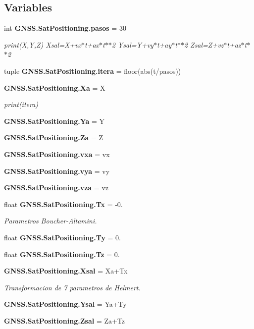 \subsection*{Variables}
\begin{DoxyCompactItemize}
\item 
int {\bf G\-N\-S\-S.\-Sat\-Positioning.\-pasos} = 30
\begin{DoxyCompactList}\small\item\em print(\-X,\-Y,\-Z) Xsal=X+vx$\ast$t+ax$\ast$t$\ast$$\ast$2 Ysal=Y+vy$\ast$t+ay$\ast$t$\ast$$\ast$2 Zsal=Z+vz$\ast$t+az$\ast$t$\ast$$\ast$2 \end{DoxyCompactList}\item 
tuple {\bf G\-N\-S\-S.\-Sat\-Positioning.\-itera} = floor(abs(t/pasos))
\item 
{\bf G\-N\-S\-S.\-Sat\-Positioning.\-Xa} = X
\begin{DoxyCompactList}\small\item\em print(itera) \end{DoxyCompactList}\item 
{\bf G\-N\-S\-S.\-Sat\-Positioning.\-Ya} = Y
\item 
{\bf G\-N\-S\-S.\-Sat\-Positioning.\-Za} = Z
\item 
{\bf G\-N\-S\-S.\-Sat\-Positioning.\-vxa} = vx
\item 
{\bf G\-N\-S\-S.\-Sat\-Positioning.\-vya} = vy
\item 
{\bf G\-N\-S\-S.\-Sat\-Positioning.\-vza} = vz
\item 
float {\bf G\-N\-S\-S.\-Sat\-Positioning.\-Tx} = -\/0.
\begin{DoxyCompactList}\small\item\em Parametros Boucher-\/\-Altamini. \end{DoxyCompactList}\item 
float {\bf G\-N\-S\-S.\-Sat\-Positioning.\-Ty} = 0.
\item 
float {\bf G\-N\-S\-S.\-Sat\-Positioning.\-Tz} = 0.
\item 
{\bf G\-N\-S\-S.\-Sat\-Positioning.\-Xsal} = Xa+Tx
\begin{DoxyCompactList}\small\item\em Transformacion de 7 parametros de Helmert. \end{DoxyCompactList}\item 
{\bf G\-N\-S\-S.\-Sat\-Positioning.\-Ysal} = Ya+Ty
\item 
{\bf G\-N\-S\-S.\-Sat\-Positioning.\-Zsal} = Za+Tz
\end{DoxyCompactItemize}
